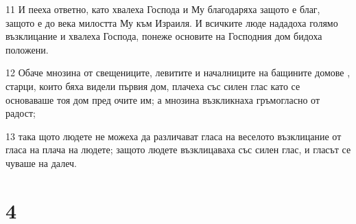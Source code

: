 \par 11 И пееха ответно, като хвалеха Господа и Му благодаряха защото е благ, защото е до века милостта Му към Израиля. И всичките люде нададоха голямо възклицание и хвалеха Господа, понеже основите на Господния дом бидоха положени.
\par 12 Обаче мнозина от свещениците, левитите и началниците на бащините домове , старци, които бяха видели първия дом, плачеха със силен глас като се основаваше тоя дом пред очите им; а мнозина възкликнаха гръмогласно от радост;
\par 13 така щото людете не можеха да различават гласа на веселото възклицание от гласа на плача на людете; защото людете възклицаваха със силен глас, и гласът се чуваше на далеч.

\chapter{4}

